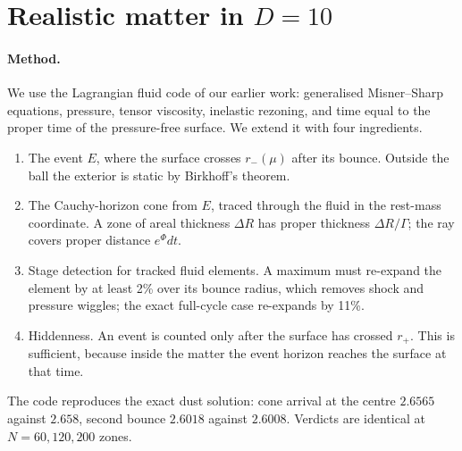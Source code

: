 \documentclass[11pt,a4paper]{article}
\theoremstyle{definition}\newtheorem{definition}[theorem]{Definition}
\theoremstyle{remark}\newtheorem{remark}[theorem]{Remark}
\begin{document}
\section{Realistic matter in $D=10$}
\paragraph{Method.} We use the Lagrangian fluid code of our earlier work: generalised Misner--Sharp equations, pressure, tensor
viscosity, inelastic rezoning, and time equal to the proper time of the pressure-free surface. We extend it with four ingredients.
\begin{enumerate}
\item The event $E$, where the surface crosses $r_-(\mu)$ after its bounce. Outside the ball the exterior is static by Birkhoff's
theorem.
\item The Cauchy-horizon cone from $E$, traced through the fluid in the rest-mass coordinate. A zone of areal thickness $\Delta R$ has
proper thickness $\Delta R/\Gamma$; the ray covers proper distance $e^{\Phi}dt$.
\item Stage detection for tracked fluid elements. A maximum must re-expand the element by at least 2\% over its bounce radius, which
removes shock and pressure wiggles; the exact full-cycle case re-expands by 11\%.
\item Hiddenness. An event is counted only after the surface has crossed $r_+$. This is sufficient, because inside the matter the event
horizon reaches the surface at that time.
\end{enumerate}
The code reproduces the exact dust solution: cone arrival at the centre $2.6565$ against $2.658$, second bounce $2.6018$ against
$2.6008$. Verdicts are identical at $N=60,120,200$ zones.
\end{document}
